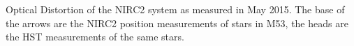 Optical Distortion of the NIRC2 system as measured in May 2015.  The base of the arrows are the NIRC2 position measurements of stars in M53, the heads are the HST measurements of the same stars. \label{quiver_may} 